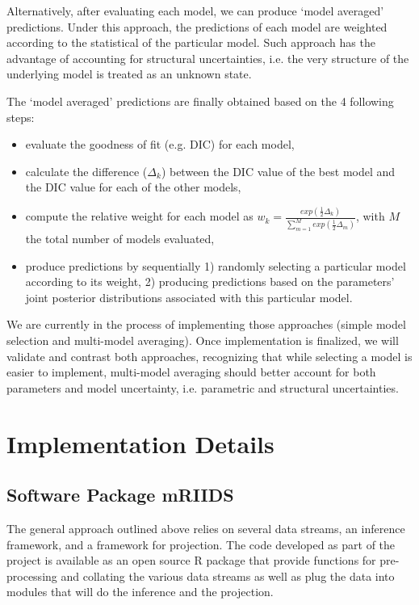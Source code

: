 \documentclass[11pt,]{article}
\begin{document}
Alternatively, after evaluating each model, we can produce `model averaged' predictions. Under this approach, the predictions
of each model are weighted according to the statistical of the particular model. Such approach has the advantage of accounting
for structural uncertainties, i.e. the very structure of the underlying model is treated as an unknown state.

The `model averaged' predictions are finally obtained based on the 4
following steps:

\begin{itemize}
\item evaluate the goodness of fit (e.g. DIC) for each model,
\item calculate the difference ($\Delta_k$) between the DIC value of the best model and the DIC value for each of the other models,
\item compute the relative weight for each model as $w_k = \frac{exp(\frac{1}{2}\Delta_k)}{\sum_{m = 1}^{M}{exp(\frac{1}{2}\Delta_m)}}$, with $M$ the total number of models evaluated,
\item produce predictions by sequentially 1) randomly selecting a particular model according to its weight, 2) producing predictions based on the parameters' joint posterior distributions associated with this particular model.
\end{itemize}

We are currently in the process of implementing those approaches (simple model selection and multi-model averaging).
Once implementation is finalized, we will validate and contrast both approaches, recognizing that while selecting a model 
is easier to implement, multi-model averaging should better
account for both parameters and model uncertainty, i.e. parametric and structural uncertainties.

\FloatBarrier
\section{Implementation Details}
\subsection{Software Package mRIIDS}

The general approach outlined above relies on several data streams, an
inference framework, and a framework for projection. The code
developed as part of the project is available as an open
source R package that provide functions for pre-processing and
collating the various data streams as well as plug the data into
modules that will do the inference and the projection. 
\end{document}
